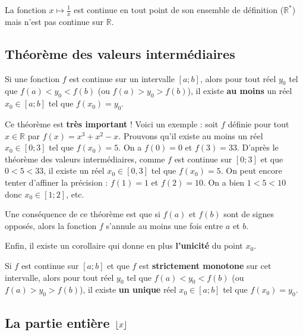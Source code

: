 	\begin{tip}[Exemple]
		La fonction $x \mapsto \frac{1}{x}$ est continue en tout point de son ensemble de définition ($\mathbb{R}^{*}$) mais n'est pas continue sur $\mathbb{R}$.
	\end{tip}

	\subsection{Théorème des valeurs intermédiaires}

	\begin{formula}
		Si une fonction $f$ est continue sur un intervalle $[a;b]$, alors pour tout réel $y_0$ tel que $f(a) < y_0 < f(b)$ (ou $f(a) > y_0 > f(b)$), il existe \textbf{au moins} un réel $x_0 \in [a;b]$ tel que $f(x_0) = y_0$.
	\end{formula}

	\begin{tip}[Exemple]
		Ce théorème est \textbf{très important} ! Voici un exemple : soit $f$ définie pour tout $x \in \mathbb{R}$ par $f(x) = x^3+x^2-x$. Prouvons qu'il existe au moins un réel $x_0 \in [0;3]$ tel que $f(x_0) = 5$. On a $f(0) = 0$ et $f(3) = 33$. D'après le théorème des valeurs intermédiaires, comme $f$ est continue sur $[0;3]$ et que $0 < 5 < 33$,
		il existe un réel $x_0 \in [0,3]$ tel que $f(x_0) = 5$.
		\newpar
		On peut encore tenter d'affiner la précision : $f(1) = 1$ et $f(2) = 10$. On a bien $1 < 5 < 10$ donc $x_0 \in [1;2]$, etc.
	\end{tip}

	\begin{tip}
		Une conséquence de ce théorème est que si $f(a)$ et $f(b)$ sont de signes opposés, alors la fonction $f$ s'annule au moins une fois entre $a$ et $b$.
	\end{tip}

	Enfin, il existe un corollaire qui donne en plus \textbf{l'unicité} du point $x_0$.

	\begin{formula}[Corollaire]
		Si $f$ est continue sur $[a;b]$ et que $f$ est \textbf{strictement monotone} sur cet intervalle, alors pour tout réel $y_0$ tel que $f(a) < y_0 < f(b)$ (ou $f(a) > y_0 > f(b)$), il existe \textbf{un unique} réel $x_0 \in [a;b]$ tel que $f(x_0) = y_0$.
	\end{formula}

	\subsection{La partie entière $\lfloor x \rfloor$}

